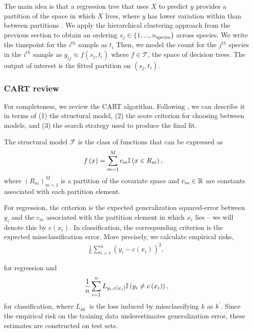 \documentclass[14pt]{extreport}
\begin{document}
The main idea is that a regression tree that uses $X$ to predict $y$ provides a
partition of the space in which $X$ lives, where $y$ has lower variation within
than between partitions \citep{breiman1984classification}. We apply the
hierarchical clustering approach from the previous section to obtain an ordering
$s_{j} \in \{1, \dots, n_{\text{species}}\}$ across species. We write the
timepoint for the $i^{th}$ sample as $t_{i}$ Then, we model the count for the
$j^{th}$ species in the $i^{th}$ sample as $y_{ij} \approx f\left(s_{j},
t_{i}\right)$ where $f \in \mathcal{T}$, the space of decision trees. The output
of interest is the fitted partition on $\left(s_{j}, t_{i}\right)$.

\subsubsection{CART review}
\label{subsubsec:cart_review}

For completeness, we review the CART algorithm. Following \citep{stat315bnotes},
we can describe it in terms of (1) the structural model, (2) the score criterion
for choosing between models, and (3) the search strategy used to produce the
final fit.

The structural model $\mathcal{F}$ is the class of functions that can be
expressed as
\begin{align*}
f\left(x\right) &= \sum_{m = 1}^{M} c_{m} \mathbb{I}\left({x \in R_{m}}\right),
\end{align*}
where $\left(R_{m}\right)_{m = 1}^{M}$ is a partition of the covariate space
and $c_{m} \in \mathbb{R}$ are constants associated with each partition element.

For regression, the criterion is the expected generalization squared-error
between $y_{i}$ and the $c_{m}$ associated with the partition element in which
$x_i$ lies -- we will denote this by $c\left(x_{i}\right)$. In classification,
the corresponding criterion is the expected missclassification error. More
precisely, we calculate empirical risks,
\begin{align*}
  \frac{1}{n} \sum_{i = 1}^{n} \left(y_{i} - c\left(x_{i}\right)\right)^{2},
\end{align*}

for regression and
\begin{align*}
  \frac{1}{n} \sum_{i = 1}^{n} L_{y_{i}, c\left(x_{i}\right)} \mathbb{I}\left({y_{i} \neq c\left(x_{i}\right)}\right),
\end{align*}
for classification, where $L_{kk^{\prime}}$ is the loss induced by
missclassifying $k$ as $k^{\prime}$. Since the empirical risk on the training
data underestimates generalization error, these estimates are constructed on
test sets.
\end{document}
